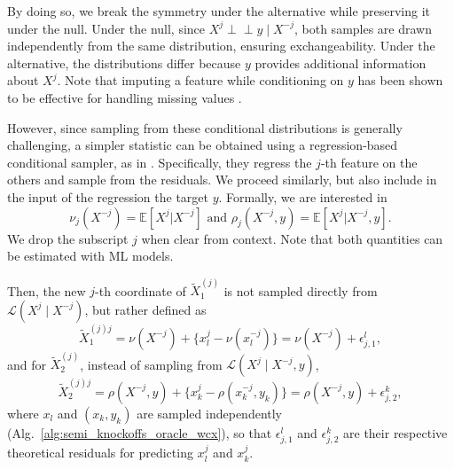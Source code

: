 \documentclass{article}
\theoremstyle{plain}
\theoremstyle{definition}
\theoremstyle{remark}
\newcommand{\indep}{\perp\!\!\!\perp}
\begin{document}



By doing so, we break the symmetry under the alternative while preserving it under the null. 
%
Under the null, since $X^j \indep y \mid X^{-j}$, both samples are drawn independently from the same distribution, ensuring exchangeability.
%
Under the alternative, the distributions differ because $y$ provides additional information about $X^j$. Note that imputing a feature while conditioning on $y$ has been shown to be effective for handling missing values \cite{DAgostinoMcGowan2024}.




However, since sampling from these conditional distributions is generally challenging, a simpler statistic can be obtained using a regression-based conditional sampler, as in \citet{Fisher2019, chamma2024statistically}. 
%
Specifically, they regress the $j$-th feature on the others and sample from the residuals. We proceed similarly, but also include in the input of the regression the target $y$.
%
Formally, we are interested in $$\nu_j(X^{-j}) = \mathbb{E}[X^j | X^{-j}]  \text{ and } 
\rho_j(X^{-j}, y) = \mathbb{E}[X^j | X^{-j}, y].$$
We drop the subscript $j$ when clear from context. Note that both quantities can be estimated with ML models.%

Then, the new $j$-th coordinate of $\widetilde{X}^{(j)}_1$ is not sampled directly from $\mathcal{L}(X^j \mid X^{-j})$, but rather defined as
\[
\widetilde{X}_1^{(j)j} = \nu(X^{-j}) + \{x_l^j - \nu(x_l^{-j})\}= \nu(X^{-j}) + \epsilon_{j, 1}^l ,
\]
and for $\widetilde{X}_2^{(j)}$, instead of sampling from $\mathcal{L}(X^j \mid X^{-j}, y)$, %
\[
\widetilde{X}_2^{(j)j} = \rho(X^{-j}, y) + \{x_k^j - \rho(x_k^{-j}, y_k)\}= \rho(X^{-j}, y) + \epsilon_{j, 2}^k,
\]
where $x_l$ and $(x_k, y_k)$ are sampled independently (Alg.~\ref{alg:semi_knockoffs_oracle_wcx}), so that $\epsilon_{j,1}^l$ and $\epsilon_{j,2}^k$ are their respective theoretical residuals for predicting $x_l^j$ and $x_k^j$.
\end{document}
